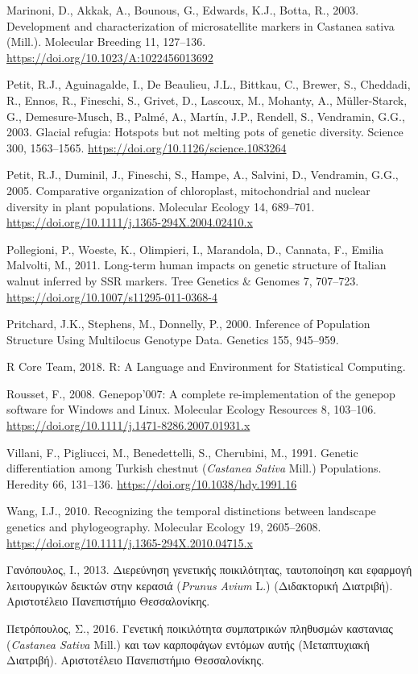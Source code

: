 \documentclass[12pt,a4paper,]{report}
\begin{document}
\leavevmode\hypertarget{ref-marinoni_development_2003}{}%
Marinoni, D., Akkak, A., Bounous, G., Edwards, K.J., Botta, R., 2003.
Development and characterization of microsatellite markers in Castanea
sativa (Mill.). Molecular Breeding 11, 127--136.
\url{https://doi.org/10.1023/A:1022456013692}

\leavevmode\hypertarget{ref-Petit2003}{}%
Petit, R.J., Aguinagalde, I., De Beaulieu, J.L., Bittkau, C., Brewer,
S., Cheddadi, R., Ennos, R., Fineschi, S., Grivet, D., Lascoux, M.,
Mohanty, A., Müller-Starck, G., Demesure-Musch, B., Palmé, A., Martín,
J.P., Rendell, S., Vendramin, G.G., 2003. Glacial refugia: Hotspots but
not melting pots of genetic diversity. Science 300, 1563--1565.
\url{https://doi.org/10.1126/science.1083264}

\leavevmode\hypertarget{ref-Petit2005}{}%
Petit, R.J., Duminil, J., Fineschi, S., Hampe, A., Salvini, D.,
Vendramin, G.G., 2005. Comparative organization of chloroplast,
mitochondrial and nuclear diversity in plant populations. Molecular
Ecology 14, 689--701.
\url{https://doi.org/10.1111/j.1365-294X.2004.02410.x}

\leavevmode\hypertarget{ref-Pollegioni2011}{}%
Pollegioni, P., Woeste, K., Olimpieri, I., Marandola, D., Cannata, F.,
Emilia Malvolti, M., 2011. Long-term human impacts on genetic structure
of Italian walnut inferred by SSR markers. Tree Genetics \& Genomes 7,
707--723. \url{https://doi.org/10.1007/s11295-011-0368-4}

\leavevmode\hypertarget{ref-pritchard_inference_2000}{}%
Pritchard, J.K., Stephens, M., Donnelly, P., 2000. Inference of
Population Structure Using Multilocus Genotype Data. Genetics 155,
945--959.

\leavevmode\hypertarget{ref-RCoreTeam2018}{}%
R Core Team, 2018. R: A Language and Environment for Statistical
Computing.

\leavevmode\hypertarget{ref-Rousset2008}{}%
Rousset, F., 2008. Genepop'007: A complete re-implementation of the
genepop software for Windows and Linux. Molecular Ecology Resources 8,
103--106. \url{https://doi.org/10.1111/j.1471-8286.2007.01931.x}

\leavevmode\hypertarget{ref-Villani1991}{}%
Villani, F., Pigliucci, M., Benedettelli, S., Cherubini, M., 1991.
Genetic differentiation among Turkish chestnut (\emph{Castanea}
\emph{Sativa} Mill.) Populations. Heredity 66, 131--136.
\url{https://doi.org/10.1038/hdy.1991.16}

\leavevmode\hypertarget{ref-Wang2010a}{}%
Wang, I.J., 2010. Recognizing the temporal distinctions between
landscape genetics and phylogeography. Molecular Ecology 19, 2605--2608.
\url{https://doi.org/10.1111/j.1365-294X.2010.04715.x}

\leavevmode\hypertarget{ref-__2013}{}%
Γανόπουλος, Ι., 2013. Διερεύνηση γενετικής ποικιλότητας, ταυτοποίηση και
εφαρμογή λειτουργικών δεικτών στην κερασιά (\emph{Prunus} \emph{Avium}
L.) (Διδακτορική Διατριβή). Αριστοτέλειο Πανεπιστήμιο Θεσσαλονίκης.

\leavevmode\hypertarget{ref-2016a}{}%
Πετρόπουλος, Σ., 2016. Γενετική ποικιλότητα συμπατρικών πληθυσμών
καστανιας (\emph{Castanea Sativa} Mill.) και των καρποφάγων εντόμων
αυτής (Mεταπτυχιακή Διατριβή). Αριστοτέλειο Πανεπιστήμιο Θεσσαλονίκης.
\end{document}
